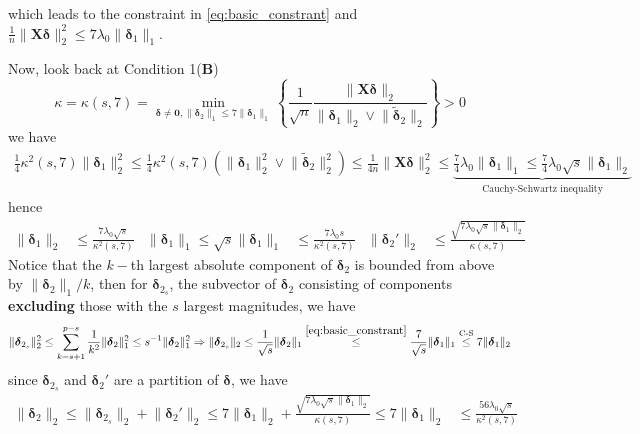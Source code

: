 \documentclass[twoside]{article}
\begin{document}
which leads to the constraint in \ref{eq:basic_constrant} and $\frac{1}{n}\lVert \mathbf{X}\boldsymbol{\delta} \rVert ^2_2 \leq 7\lambda_0 \lVert \boldsymbol{\delta}_1 \rVert _1$.

Now, look back at Condition 1(\textbf{B})
$$
\kappa = \kappa(s,7) = \min_{\boldsymbol{\delta}\neq \mathbf{0}, \lVert\boldsymbol{\delta}_2\rVert _1 \leq 7 \lVert\boldsymbol{\delta}_1\rVert _1} \left\{ \frac{1}{\sqrt{n}}\frac{\lVert\mathbf{X}\boldsymbol{\delta}\rVert _2}{\lVert\boldsymbol{\delta}_1\rVert _2 \vee \lVert\tilde{\boldsymbol{\delta}}_2\rVert _2} \right\} > 0
$$
we have 
\begin{align*}
    \frac{1}{4}\kappa^2(s,7)\lVert\boldsymbol{\delta}_1\rVert^2_2 \leq \frac{1}{4}\kappa^2(s,7)\left( \lVert\boldsymbol{\delta}_1\rVert^2_2 \vee \lVert\tilde{\boldsymbol{\delta}}_2\rVert^2_2 \right)\leq \frac{1}{4n}\lVert\mathbf{X}\boldsymbol{\delta}\rVert^2_2\leq \underbrace{\frac{7}{4}\lambda_0 \lVert \boldsymbol{\delta}_1 \rVert _1 \leq \frac{7}{4}\lambda_0\sqrt{s} \lVert \boldsymbol{\delta}_1 \rVert _2 }_{\text{Cauchy-Schwartz inequality}}
\end{align*}
hence
\begin{align*}
    \lVert\boldsymbol{\delta}_1\rVert _2 &\leq \frac{7\lambda_0 \sqrt{s}}{\kappa^2(s,7)} & \lVert\boldsymbol{\delta}_1\rVert _1\leq \sqrt{s} \lVert\boldsymbol{\delta}_1\rVert _1 &\leq \frac{7\lambda_0 s}{\kappa^2(s,7)} & \lVert\boldsymbol{\delta}_2'\rVert _2 &\leq \frac{\sqrt{7\lambda_0 \sqrt{s} \lVert \boldsymbol{\delta}_1 \rVert _2}}{\kappa(s,7)}
\end{align*}
Notice that the $k-$th largest absolute component of $\boldsymbol{\delta}_2$ is bounded from above by $\lVert\boldsymbol{\delta}_2\rVert _1/k$, then for $\boldsymbol{\delta}_{2_s}$, the subvector of $\boldsymbol{\delta}_2$ consisting of components \textbf{excluding} those with the $s$ largest magnitudes, we have
$$
\lVert\boldsymbol{\delta}_{2_s}\rVert _2^2\leq  \sum^{p-s}_{k=s+1}\frac{1}{k^2} \lVert\boldsymbol{\delta}_2\rVert^2 _1 \leq s^{-1}\lVert\boldsymbol{\delta}_2\rVert _1^2 \Rightarrow \lVert\boldsymbol{\delta}_{2_s}\rVert _2 \leq \frac{1}{\sqrt{s}}\lVert\boldsymbol{\delta}_2\rVert _1  \overset{\ref{eq:basic_constrant}}{\leq} \frac{7}{\sqrt{s}}\lVert\boldsymbol{\delta}_1\rVert _1 \overset{\text{C-S}}{\leq} 7\lVert\boldsymbol{\delta}_1\rVert _2
$$
since $\boldsymbol{\delta}_{2_s}$ and $\boldsymbol{\delta}_{2}'$ are a partition of $\boldsymbol{\delta}$, we have 
\begin{align*}
    \lVert\boldsymbol{\delta}_2\rVert _2 \leq \lVert\boldsymbol{\delta}_{2_s}\rVert _2 + \lVert\boldsymbol{\delta}_2'\rVert _2 \leq 7 \lVert\boldsymbol{\delta}_1\rVert _2 + \frac{\sqrt{7\lambda_0 \sqrt{s} \lVert \boldsymbol{\delta}_1 \rVert _2}}{\kappa(s,7)}\leq 7 \lVert\boldsymbol{\delta}_1\rVert _2 &\leq \frac{56\lambda_0 \sqrt{s}}{\kappa^2(s,7)} 
\end{align*}
\end{document}
